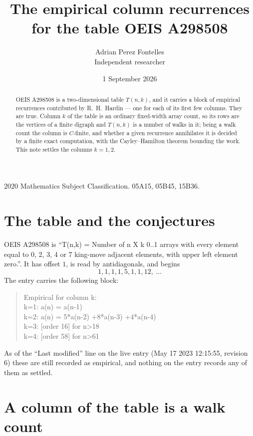 \documentclass[11pt,a4paper]{article}
\title{The empirical column recurrences for the table OEIS A298508}
\author{Adrian Perez Fontelles\\ \small Independent researcher}
\date{1 September 2026}
\theoremstyle{plain}
\theoremstyle{definition}
\begin{document}
\maketitle

\begin{abstract}
OEIS A298508 is a two-dimensional table $T(n,k)$, and it carries a block of empirical
recurrences contributed by R.~H.~Hardin --- one for each of its first few columns. They are
true. Column $k$ of the table is an ordinary fixed-width array count, so its rows are the
vertices of a finite digraph and $T(n,k)$ is a number of walks in it; being a walk count the
column is $C$-finite, and whether a given recurrence annihilates it is decided by a finite
exact computation, with the Cayley--Hamilton theorem bounding the work. This note settles the columns $k=1, 2$.
\end{abstract}

\noindent\small 2020 Mathematics Subject Classification. 05A15, 05B45, 15B36.\normalsize

\section{The table and the conjectures}

OEIS A298508 is ``T(n,k) = Number of n X k 0..1 arrays with every element equal to 0, 2, 3, 4 or 7 king-move adjacent elements, with upper left element zero.''. It has offset $1$, is
read by antidiagonals, and begins
\[
1, 1, 1, 1, 5, 1, 1, 12,\ \dots
\]
The entry carries the following block:
\begin{quote}\small
Empirical for column k:\\
k=1: a(n) = a(n-1)\\
k=2: a(n) = 5*a(n-2) +8*a(n-3) +4*a(n-4)\\
k=3: [order 16] for n>18\\
k=4: [order 58] for n>61\\
\end{quote}
As of the ``Last modified'' line on the live entry (May 17 2023 12:15:55, revision 6) these are still
recorded as empirical, and nothing on the entry records any of them as settled.

\section{A column of the table is a walk count}
\end{document}
